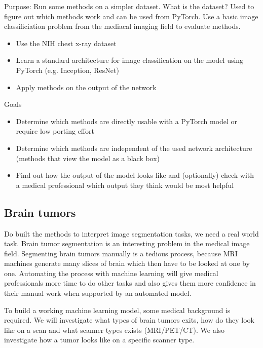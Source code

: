 Purpose: Run some methods on a simpler dataset.
What is the dataset?
Used to figure out which methods work and can be used from PyTorch.
Use a basic image classificiation problem from the mediacal imaging field to evaluate methods.
\begin{itemize}
    \item Use the NIH chest x-ray dataset
    \item Learn a standard architecture for image classification on the model using PyTorch (e.g. Inception, ResNet)
    \item Apply methods on the output of the network
\end{itemize}


Goals
\begin{itemize}
    \item Determine which methods are directly usable with a PyTorch model or require low porting effort
    \item Determine which methods are independent of the used network architecture (methods that view the model as a black box)
    \item Find out how the output of the model looks like and (optionally) check with a medical professional which output they think would be most helpful
\end{itemize}


\subsection{Brain tumors}
Do built the methods to interpret image segmentation tasks, we need a real world task. Brain tumor segmentation is an interesting problem in the medical image field. Segmenting brain tumors manually is a tedious process, because MRI machines generate many slices of brain which then have to be looked at one by one. Automating the process with machine learning will give medical professionals more time to do other tasks and also gives them more confidence in their manual work when supported by an automated model.

To build a working machine learning model, some medical background is required. We will investigate what types of brain tumors exits, how do they look like on a scan and what scanner types exists (MRI/PET/CT). We also investigate how a tumor looks like on a specific scanner type.

